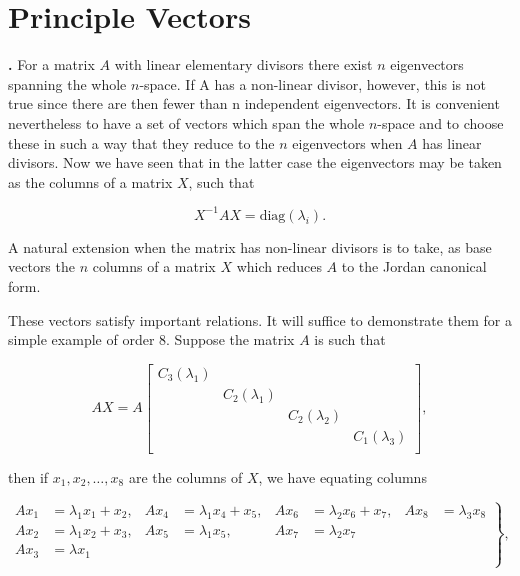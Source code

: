 \documentclass[10pt, reqno]{article}
\numberwithin{equation}{section}
\begin{document}


\section*{Principle Vectors}
\setcounter{section}{39}

\textbf{.} For a matrix $A$ with linear elementary divisors there exist $n$ eigenvectors
spanning the whole $n$-space. If A has a non-linear divisor, however, this is not
true since there are then fewer than n independent eigenvectors. It is convenient
nevertheless to have a set of vectors which span the whole $n$-space and to choose
these in such a way that they reduce to the $n$ eigenvectors when $A$ has linear
divisors. Now we have seen that in the latter case the eigenvectors may be taken
as the columns of a matrix $X$, such that



\begin{equation}
X^{-1}AX = \textrm{diag}(\lambda_i).
\end{equation}

\noindent A natural extension when the matrix has non-linear divisors is to take, as base
vectors the $n$ columns of a matrix $X$ which reduces $A$ to the Jordan canonical form.

These vectors satisfy important relations. It will suffice to demonstrate them
for a simple example of order 8. Suppose the matrix $A$ is such that

\begin{equation}
AX = A
\begin{bmatrix}
C_3(\lambda_1) & & & \\
& C_2(\lambda_1) & & \\
& & C_2(\lambda_2) & \\
& & & C_1(\lambda_3) \\
\end{bmatrix},
\end{equation}

\noindent then if $x_1, x_2, \dots,x_8$ are the columns of $X$, we have equating columns


\begin{equation}
	\left.
	\begin{aligned}
	Ax_1 &= \lambda_1 x_1 + x_2, & Ax_4 &= \lambda_1 x_4 + x_5 , & Ax_6 &= \lambda_2 x_6 + x_7, & Ax_8 &= \lambda_3 x_8 \\
	Ax_2 &= \lambda_1 x_2 + x_3, & Ax_5 &= \lambda_1 x_5, & Ax_7 &= \lambda_2 x_7 & & \\
	Ax_3 &= \lambda x_1 & & & \\ 
	\end{aligned}
	\right\} ,	
\end{equation}
\end{document}
